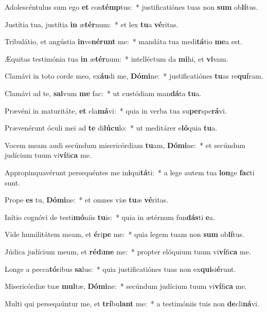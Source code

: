\item Adolescéntulus sum ego \textbf{et} con\textbf{témp}tus:~* justificatiónes tuas non \textbf{sum} ob\textbf{lí}tus.
\item Justítia tua, justítia \textbf{in} æ\textbf{tér}num:~* et lex \textbf{tu}a \textbf{vé}ritas.
\item Tribulátio, et angústia \textbf{in}ve\textbf{né}\textbf{runt} me:~* mandáta tua medi\textbf{tá}tio \textbf{me}a est.
\item Æquitas testimónia tua \textbf{in} æ\textbf{tér}num:~* intelléctum da \textbf{mi}hi, et \textbf{vi}vam.
\item Clamávi in toto corde meo, ex\textbf{áu}di me, \textbf{Dó}\textbf{mi}ne:~* justificatiónes \textbf{tu}as re\textbf{quí}ram.
\item Clamávi ad te, \textbf{sal}vum \textbf{me} fac:~* ut custódiam man\textbf{dá}ta \textbf{tu}a.
\item Prævéni in maturitáte, \textbf{et} cla\textbf{má}vi:~* quia in verba tua su\textbf{per}spe\textbf{rá}vi.
\item Prævenérunt óculi mei ad \textbf{te} di\textbf{lú}\textbf{cu}lo:~* ut meditárer e\textbf{ló}quia \textbf{tu}a.
\item Vocem meam audi secúndum misericórdiam \textbf{tu}am, \textbf{Dó}\textbf{mi}ne:~* et secúndum judícium tuum vi\textbf{ví}fi\textbf{ca} me.
\item Appropinquavérunt persequéntes me in\textbf{i}qui\textbf{tá}ti:~* a lege autem tua \textbf{lon}ge \textbf{fac}ti sunt.
\item Prope \textbf{es} tu, \textbf{Dó}\textbf{mi}ne:~* et omnes viæ \textbf{tu}æ \textbf{vé}ritas.
\item Inítio cognóvi de testi\textbf{mó}niis \textbf{tu}is:~* quia in ætérnum fun\textbf{dás}ti \textbf{e}a.
\item Vide humilitátem meam, et \textbf{é}ri\textbf{pe} me:~* quia legem tuam non \textbf{sum} ob\textbf{lí}tus.
\item Júdica judícium meum, et \textbf{réd}i\textbf{me} me:~* propter elóquium tuum vi\textbf{ví}fi\textbf{ca} me.
\item Longe a pecca\textbf{tó}ribus \textbf{sa}lus:~* quia justificatiónes tuas non ex\textbf{qui}si\textbf{é}runt.
\item Misericórdiæ tuæ \textbf{mul}tæ, \textbf{Dó}\textbf{mi}ne:~* secúndum judícium tuum vi\textbf{ví}fi\textbf{ca} me.
\item Multi qui persequúntur me, et \textbf{trí}bu\textbf{lant} me:~* a testimóniis tuis non \textbf{de}cli\textbf{ná}vi.
